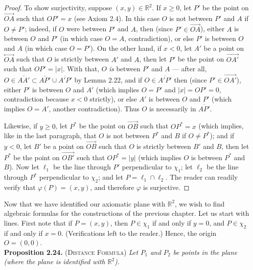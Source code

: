 \documentclass[leqno]{book}
\begin{document}
\begin{proof}
To show surjectivity, suppose $(x,y)\in\mathbb R^2$.  If $x\geqslant 0$, let $P'$ be the point on $\overset{\longrightarrow}{OA}$ such that $OP'=x$ (see Axiom 2.4).  In this case $O$ is not between $P'$ and $A$ if $O\ne P'$; indeed, if $O$ were between $P'$ and $A$, then (since $P'\in\overset{\longrightarrow}{OA}$), either $A$ is between $O$ and $P'$ (in which case $O=A$, contradiction), or else $P'$ is between $O$ and $A$ (in which case $O=P'$).  On the other hand, if $x<0$, let $A'$ be a point on $\overset{\longleftrightarrow}{OA}$ such that $O$ is strictly between $A'$ and $A$, then let $P'$ be the point on $\overset{\longrightarrow}{OA'}$ such that $OP'=|x|$.  With that, $O$ \emph{is} between $P'$ and $A$ \---- after all, $O\in\overline{AA'}\subset\overline{AP'}\cup\overline{A'P'}$ by Lemma 2.22, and if $O\in\overline{A'P'}$ then (since $P'\in\overset{\longrightarrow}{OA'}$), either $P'$ is between $O$ and $A'$ (which implies $O=P'$ and $|x|=OP'=0$, contradiction because $x<0$ strictly), or else $A'$ is between $O$ and $P'$ (which implies $O=A'$, another contradiction).  Thus $O$ is necessarily in $\overline{AP'}$.

Likewise, if $y\geqslant 0$, let $P^*$ be the point on $\overset{\longrightarrow}{OB}$ such that $OP^*=x$ (which implies, like in the last paragraph, that $O$ is not between $P^*$ and $B$ if $O\ne P^*$); and if $y<0$, let $B'$ be a point on $\overset{\longrightarrow}{OB}$ such that $O$ is strictly between $B'$ and $B$, then let $P^*$ be the point on $\overset{\longrightarrow}{OB'}$ such that $OP^*=|y|$ (which implies $O$ is between $P^*$ and $B$).  Now let $\ell_1$ be the line through $P'$ perpendicular to $\chi_1$; let $\ell_2$ be the line through $P^*$ perpendicular to $\chi_2$; and let $P=\ell_1\cap\ell_2$.  The reader can readily verify that $\varphi(P)=(x,y)$, and therefore $\varphi$ is surjective.
\end{proof} %

\noindent Now that we have identified our axiomatic plane with $\mathbb R^2$, we wish to find algebraic formulas for the constructions of the previous chapter.  Let us start with lines.  First note that if $P=(x,y)$, then $P\in\chi_1$ if and only if $y=0$, and $P\in\chi_2$ if and only if $x=0$.  (Verifications left to the reader.)  Hence, the origin $O=(0,0)$.\\

\noindent\textbf{Proposition 2.24.} \textsc{(Distance Formula)} \emph{Let $P_1$ and $P_2$ be points in the plane (where the plane is identified with $\mathbb R^2$).}
\end{document}
